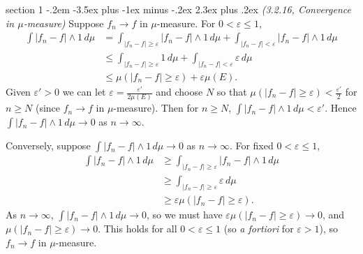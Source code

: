 \documentclass[12pt]{article}
\makeatletter
\theoremstyle{norm}
\newcommand{\ep}[0]{\varepsilon}
\newcommand{\iy}[0]{\infty}
\newenvironment{problem}{\@startsection
       {section}
       {1}
       {-.2em}
       {-3.5ex plus -1ex minus -.2ex}
       {2.3ex plus .2ex}
       {\pagebreak[3]%
       \large\bf\noindent{Problem }
       }
       }
       {%
       }
\makeatother
\begin{document}
\begin{problem}{\it(3.2.16, Convergence in $\mu$-measure)}
Suppose $f_n\to f$ in $\mu$-measure. 
For $0<\ep\le1$,
\begin{align*}
\int|f_n-f|\wedge 1\,d\mu
&=\int_{|f_n-f|\ge \ep} |f_n-f|\wedge 1\,d\mu
+\int_{|f_n-f|<\ep} |f_n-f|\wedge 1 \,d\mu\\
&\le  \int_{|f_n-f|\ge \ep} 1\,d\mu
+\int_{|f_n-f|<\ep} \ep \,d\mu\\
&\le \mu(|f_n-f|\ge \ep)+\ep \mu(E).
\end{align*}
Given $\ep'>0$ we can let $\ep=\frac{\ep'}{2\mu(E)}$ and choose $N$ so that $\mu(|f_n-f|\ge \ep)<\frac{\ep'}{2}$ for $n\ge N$ (since $f_n\to f$ in $\mu$-measure). Then for $n\ge N$, $\int |f_n-f|\wedge 1 \,d\mu <\ep'$.  
Hence $\int |f_n-f|\wedge1\,d\mu\to 0$ as $n\to\iy$.

Conversely, suppose $\int |f_n-f|\wedge1\,d\mu\to 0$ as $n\to\iy$. For fixed $0<\ep\le1$, 
\begin{align*}
\int |f_n-f|\wedge 1\,d\mu
&\ge \int_{|f_n-f|\ge \ep} |f_n-f|\wedge 1\,d\mu\\
&\ge \int_{|f_n-f|\ge \ep} \ep\,d\mu\\
&\ge  \ep\mu(|f_n-f|\ge\ep).
\end{align*}
As $n\to \iy$, $\int|f_n-f|\wedge 1\,d\mu\to 0$, so we must have $\ep\mu(|f_n-f|\ge \ep)\to 0$, and $\mu(|f_n-f|\ge \ep)\to 0$. This holds for all $0<\ep\le1$ (so {\it a fortiori} for $\ep>1$), so $f_n\to f$ in $\mu$-measure.

\end{problem}
\end{document}

